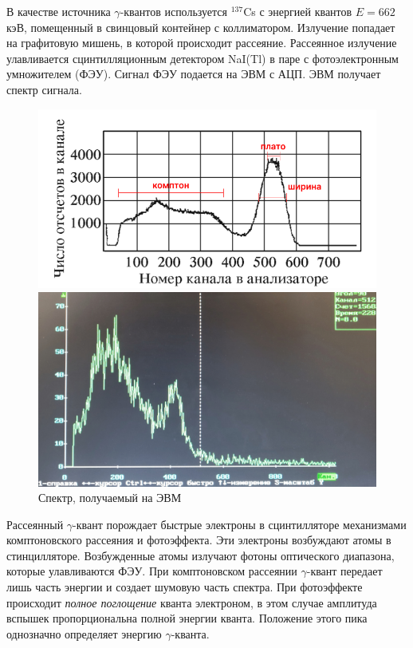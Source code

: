 \documentclass[12pt,a4paper]{article}
\begin{document}
	В качестве источника $\gamma$-квантов используется $^{137}$Cs с энергией квантов $E = 662$ кэВ, помещенный в свинцовый контейнер с коллиматором. Излучение попадает на графитовую мишень, в которой происходит рассеяние. Рассеянное излучение улавливается сцинтилляционным детектором NaI(Tl) в паре с фотоэлектронным умножителем (ФЭУ). Сигнал ФЭУ подается на ЭВМ с АЦП. ЭВМ получает спектр сигнала.
	
	\begin{figure}[H]
		\centering
		\begin{minipage}{0.5\textwidth}
			\centering
			\includegraphics[width=0.9\linewidth]{res/spectrum.png}
		\end{minipage}%
		\begin{minipage}{0.5\textwidth}
			\centering
			\includegraphics[width=0.9\linewidth]{photos/spectrum.jpg}
		\end{minipage}
		\caption{Спектр, получаемый на ЭВМ}
		\label{fig:spectrum}
	\end{figure}
	
	Рассеянный $\gamma$-квант порождает быстрые электроны в сцинтилляторе механизмами комптоновского рассеяния и фотоэффекта. Эти электроны возбуждают атомы в стинцилляторе. Возбужденные атомы излучают фотоны оптического диапазона, которые улавливаются ФЭУ.
	При комптоновском рассеянии $\gamma$-квант передает лишь часть энергии и создает шумовую часть спектра. При фотоэффекте происходит \textit{полное поглощение} кванта электроном, в этом случае амплитуда вспышек пропорциональна полной энергии кванта. Положение этого пика однозначно определяет энергию $\gamma$-кванта.
	
\end{document}
